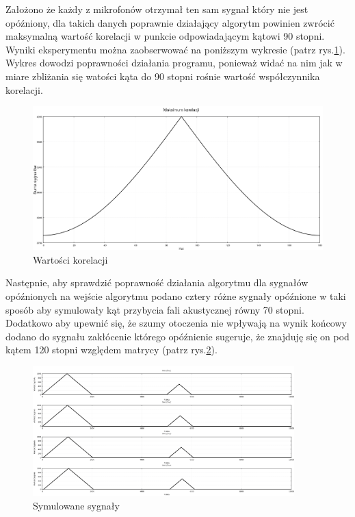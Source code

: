 \documentclass[eng,printmode]{mgr}
\begin{document}
\newpage

Założono że każdy z mikrofonów otrzymał ten sam sygnał który nie jest opóźniony, dla takich danych poprawnie działający algorytm powinien zwrócić maksymalną wartość korelacji w punkcie odpowiadającym kątowi 90 stopni. Wyniki eksperymentu można zaobserwować na poniższym wykresie
(patrz rys.\ref{fig-suma}). Wykres dowodzi poprawności działania programu, ponieważ widać na nim jak w miare zbliżania się watości kąta do 90 stopni rośnie wartość współczynnika korelacji.

\begin{figure}[!ht]

    \centering

  \includegraphics[width=1\textwidth, angle=0]{suma.png}

    \caption{Wartości korelacji}
 \label{fig-suma}
    

\end{figure}


Następnie, aby sprawdzić poprawność działania algorytmu dla sygnałów opóźnionych na wejście algorytmu podano cztery różne sygnały opóźnione w taki sposób aby symulowały kąt przybycia fali akustycznej równy 70 stopni. Dodatkowo aby upewnić się, że szumy otoczenia nie wpływają na wynik końcowy dodano do sygnału  zakłócenie którego opóźnienie sugeruje, że znajduję się on pod kątem 120 stopni względem matrycy (patrz rys.\ref{fig-opoznienia}). 

\begin{figure}[!ht]

    \centering

  \includegraphics[width=0.9\textwidth, angle=0]{sygnaly.png}

    \caption{Symulowane sygnały}
 \label{fig-opoznienia}
    

\end{figure}
\end{document}
